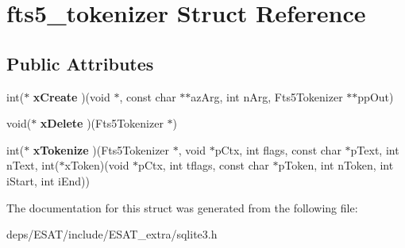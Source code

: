\hypertarget{structfts5__tokenizer}{}\section{fts5\+\_\+tokenizer Struct Reference}
\label{structfts5__tokenizer}
\subsection*{Public Attributes}
\begin{DoxyCompactItemize}
\item 
\mbox{\label{structfts5__tokenizer_a61846ad000b2d38a1264c342c8201d5c}} 
int($\ast$ {\bfseries x\+Create} )(void $\ast$, const char $\ast$$\ast$az\+Arg, int n\+Arg, Fts5\+Tokenizer $\ast$$\ast$pp\+Out)
\item 
\mbox{\label{structfts5__tokenizer_aaaa88b9f3e50f0b1120a05fb1bbb251f}} 
void($\ast$ {\bfseries x\+Delete} )(Fts5\+Tokenizer $\ast$)
\item 
\mbox{\label{structfts5__tokenizer_ae65ca5a9b1e6d5c1ef09731fccefa577}} 
int($\ast$ {\bfseries x\+Tokenize} )(Fts5\+Tokenizer $\ast$, void $\ast$p\+Ctx, int flags, const char $\ast$p\+Text, int n\+Text, int($\ast$x\+Token)(void $\ast$p\+Ctx, int tflags, const char $\ast$p\+Token, int n\+Token, int i\+Start, int i\+End))
\end{DoxyCompactItemize}


The documentation for this struct was generated from the following file\+:\begin{DoxyCompactItemize}
\item 
deps/\+E\+S\+A\+T/include/\+E\+S\+A\+T\+\_\+extra/sqlite3.\+h\end{DoxyCompactItemize}
